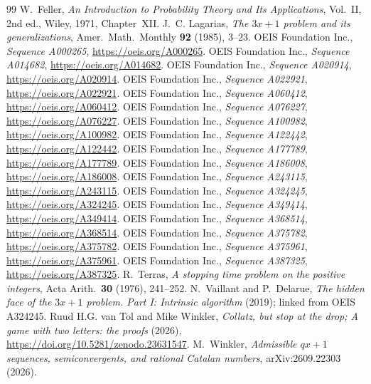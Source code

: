 \documentclass[10pt,a4paper,titlepage]{article}
\begin{document}
\begin{thebibliography}{99}
 W.~Feller, \emph{An Introduction to Probability Theory and
  Its Applications}, Vol.~II, 2nd ed., Wiley, 1971, Chapter~XII.
 J.~C. Lagarias, \emph{The $3x+1$ problem and its
  generalizations}, Amer.\ Math.\ Monthly \textbf{92} (1985), 3--23.
 OEIS Foundation Inc., \emph{Sequence A000265},
  \url{https://oeis.org/A000265}.
 OEIS Foundation Inc., \emph{Sequence A014682},
  \url{https://oeis.org/A014682}.
 OEIS Foundation Inc., \emph{Sequence A020914},
  \url{https://oeis.org/A020914}.
 OEIS Foundation Inc., \emph{Sequence A022921},
  \url{https://oeis.org/A022921}.
 OEIS Foundation Inc., \emph{Sequence A060412},
  \url{https://oeis.org/A060412}.
 OEIS Foundation Inc., \emph{Sequence A076227},
  \url{https://oeis.org/A076227}.
 OEIS Foundation Inc., \emph{Sequence A100982},
  \url{https://oeis.org/A100982}.
 OEIS Foundation Inc., \emph{Sequence A122442},
  \url{https://oeis.org/A122442}.
 OEIS Foundation Inc., \emph{Sequence A177789},
  \url{https://oeis.org/A177789}.
 OEIS Foundation Inc., \emph{Sequence A186008},
  \url{https://oeis.org/A186008}.
 OEIS Foundation Inc., \emph{Sequence A243115},
  \url{https://oeis.org/A243115}.
 OEIS Foundation Inc., \emph{Sequence A324245},
  \url{https://oeis.org/A324245}.
 OEIS Foundation Inc., \emph{Sequence A349414},
  \url{https://oeis.org/A349414}.
 OEIS Foundation Inc., \emph{Sequence A368514},
  \url{https://oeis.org/A368514}.
 OEIS Foundation Inc., \emph{Sequence A375782},
  \url{https://oeis.org/A375782}.
 OEIS Foundation Inc., \emph{Sequence A375961},
  \url{https://oeis.org/A375961}.
 OEIS Foundation Inc., \emph{Sequence A387325},
  \url{https://oeis.org/A387325}.
 R.~Terras, \emph{A stopping time problem on the positive
  integers}, Acta Arith.\ \textbf{30} (1976), 241--252.
 N.~Vaillant and P.~Delarue, \emph{The hidden face of the
  $3x+1$ problem. Part I: Intrinsic algorithm} (2019); linked from OEIS A324245.
 Ruud H.G. van Tol and Mike Winkler, \emph{Collatz, but stop at the drop; A game with two
  letters: the proofs} (2026), \url{https://doi.org/10.5281/zenodo.23631547}.
 M.~Winkler, \emph{Admissible $qx+1$ sequences,
  semiconvergents, and rational Catalan numbers}, arXiv:2609.22303 (2026).
\end{thebibliography}

\printindex
\end{document}
